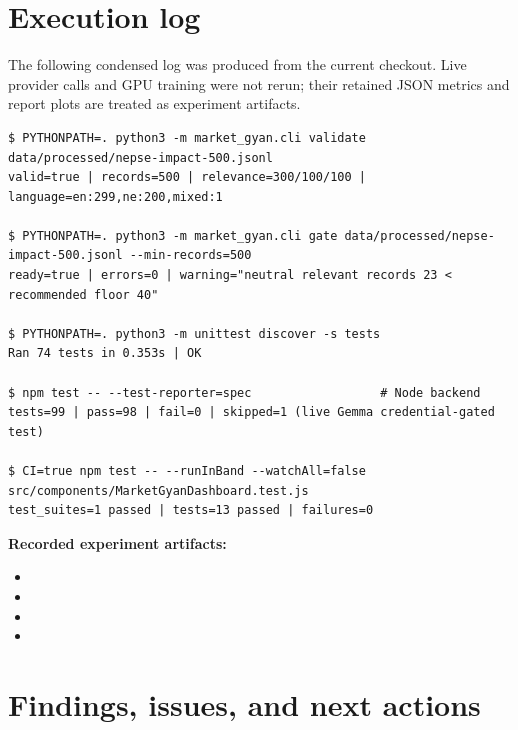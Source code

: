 \documentclass[10pt,a4paper]{article}
\begin{document}
\clearpage
\section{Execution log}

The following condensed log was produced from the current checkout. Live provider calls and GPU
training were not rerun; their retained JSON metrics and report plots are treated as experiment artifacts.

\begin{lstlisting}
$ PYTHONPATH=. python3 -m market_gyan.cli validate data/processed/nepse-impact-500.jsonl
valid=true | records=500 | relevance=300/100/100 | language=en:299,ne:200,mixed:1

$ PYTHONPATH=. python3 -m market_gyan.cli gate data/processed/nepse-impact-500.jsonl --min-records=500
ready=true | errors=0 | warning="neutral relevant records 23 < recommended floor 40"

$ PYTHONPATH=. python3 -m unittest discover -s tests
Ran 74 tests in 0.353s | OK

$ npm test -- --test-reporter=spec                  # Node backend
tests=99 | pass=98 | fail=0 | skipped=1 (live Gemma credential-gated test)

$ CI=true npm test -- --runInBand --watchAll=false src/components/MarketGyanDashboard.test.js
test_suites=1 passed | tests=13 passed | failures=0
\end{lstlisting}

\textbf{Recorded experiment artifacts:}
\begin{itemize}
  \item {}
  \item {}
  \item {}
  \item {}
\end{itemize}

\section{Findings, issues, and next actions}
\end{document}
